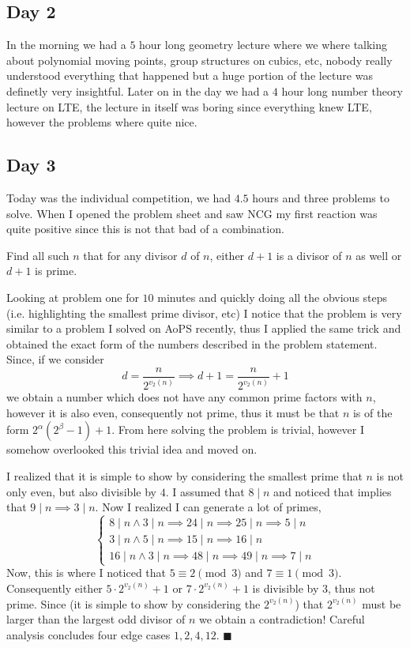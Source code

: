 \documentclass{article}
\begin{document}
\subsection{Day 2}

In the morning we had a \(5\) hour long geometry lecture where we where talking about polynomial moving points, group structures on cubics, etc, nobody really understood everything that happened but a huge portion of the lecture was definetly very insightful. Later on in the day we had a \(4\) hour long number theory lecture on LTE, the lecture in itself was boring since everything knew LTE, however the problems where quite nice.

\subsection{Day 3}

Today was the individual competition, we had \(4.5\) hours and three problems to solve. When I opened the problem sheet and saw NCG my first reaction was quite positive since this is not that bad of a combination.
\begin{problem}
  Find all such \(n\) that for any divisor \(d\) of \(n\), either \(d + 1\) is a divisor of \(n\) as well or \(d + 1\) is prime.
\end{problem}

Looking at problem one for \(10\) minutes and quickly doing all the obvious steps (i.e. highlighting the smallest prime divisor, etc) I notice that the problem is very similar to a problem I solved on AoPS recently, thus I applied the same trick and obtained the exact form of the numbers described in the problem statement. Since, if we consider \[d = \frac{n}{2^{v_2(n)}} \implies d + 1 = \frac{n}{2^{v_2(n)}} + 1\] we obtain a number which does not have any common prime factors with \(n\), however it is also even, consequently not prime, thus it must be that \(n\) is of the form \(2^{\alpha}(2^{\beta} - 1) + 1\). From here solving the problem is trivial, however I somehow overlooked this trivial idea and moved on.

I realized that it is simple to show by considering the smallest prime that \(n\) is not only even, but also divisible by \(4\). I assumed that \(8 \mid n\) and noticed that implies that \(9 \mid n \implies 3 \mid n\). Now I realized I can generate a lot of primes,
\[\begin{cases}
  8 \mid n \land 3 \mid n \implies 24 \mid n \implies 25 \mid n \implies 5 \mid n \\
  3 \mid n \land 5 \mid n \implies 15 \mid n \implies 16 \mid n \\
  16 \mid n \land 3 \mid n \implies 48 \mid n \implies 49 \mid n \implies 7 \mid n
\end{cases}\]
Now, this is where I noticed that \(5 \equiv 2 \pmod{3}\) and \(7 \equiv 1 \pmod{3}\). Consequently either \(5 \cdot 2^{v_2(n)} + 1\) or \(7 \cdot 2^{v_2(n)} + 1\) is divisible by \(3\), thus not prime. Since (it is simple to show by considering the \(2^{v_2(n)}\)) that \(2^{v_2(n)}\) must be larger than the largest odd divisor of \(n\) we obtain a contradiction! Careful analysis concludes four edge cases \(1, 2, 4, 12\). \(\blacksquare\)
\end{document}
